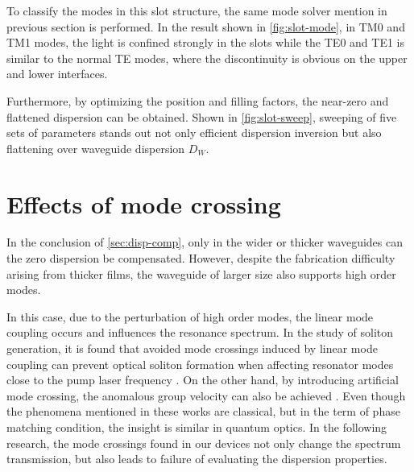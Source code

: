 \begin{figure}
	\centering
	
 	\label{fig:slot-mode}
\end{figure}

\begin{figure}
	\centering
	
	\label{fig:slot-sweep}
\end{figure}

To classify the modes in this slot structure, the same mode solver mention in previous section is performed.
In the result shown in \autoref{fig:slot-mode}, in TM0 and TM1 modes, the light is confined strongly in the slots while the TE0 and TE1 is similar to the normal TE modes, where the discontinuity is obvious on the upper and lower interfaces.

Furthermore, by optimizing the position and filling factors, the near-zero and flattened dispersion can be obtained. Shown in \autoref{fig:slot-sweep}, sweeping of five sets of parameters stands out not only efficient dispersion inversion but also flattening over waveguide dispersion $ D_W $.

\section{Effects of mode crossing}

In the conclusion of \autoref{sec:disp-comp},
only in the wider or thicker waveguides can the zero dispersion be compensated. However, 
despite the fabrication difficulty arising from thicker films,
the waveguide of larger size also supports high order modes. 

In this case, due to the perturbation of high order modes, the linear mode coupling occurs and influences the resonance spectrum. 
In the study of soliton generation,
it is found that avoided mode crossings induced by linear mode coupling can prevent optical soliton formation when affecting resonator modes close to the pump laser frequency \cites{Herr2014a,Bao2018}. On the other hand, by introducing artificial mode crossing, the anomalous group velocity can also be achieved \cite{Kim2017}. Even though the phenomena mentioned in these works are classical, but in the term of phase matching condition, the insight is similar in quantum optics.
In the following research, the mode crossings found in our devices not only change the spectrum transmission, but also leads to failure of evaluating the dispersion properties.


